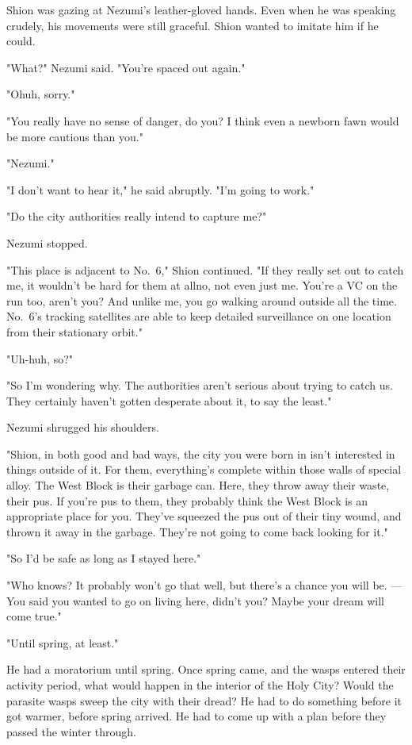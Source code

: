 Shion was gazing at Nezumi's leather-gloved hands. Even when he was
speaking crudely, his movements were still graceful. Shion wanted to
imitate him if he could.

"What?" Nezumi said. "You're spaced out again."

"Oh\el uh, sorry."

"You really have no sense of danger, do you? I think even a newborn fawn
would be more cautious than you."

"Nezumi."

"I don't want to hear it," he said abruptly. "I'm going to work."

"Do the city authorities really intend to capture me?"

Nezumi stopped.

"This place is adjacent to No.~6," Shion continued. "If they really set
out to catch me, it wouldn't be hard for them at all\el no, not even
just me. You're a VC on the run too, aren't you? And unlike me, you go
walking around outside all the time. No.~6's tracking satellites are
able to keep detailed surveillance on one location from their stationary
orbit."

"Uh-huh, so?"

"So I'm wondering why. The authorities aren't serious about trying to
catch us. They certainly haven't gotten desperate about it, to say the
least."

Nezumi shrugged his shoulders.

"Shion, in both good and bad ways, the city you were born in isn't
interested in things outside of it. For them, everything's complete
within those walls of special alloy. The West Block is their garbage
can. Here, they throw away their waste, their pus. If you're pus to
them, they probably think the West Block is an appropriate place for
you. They've squeezed the pus out of their tiny wound, and thrown it
away in the garbage. They're not going to come back looking for it."

"So I'd be safe as long as I stayed here."

"Who knows? It probably won't go that well, but there's a chance you
will be. ---You said you wanted to go on living here, didn't you? Maybe
your dream will come true."

"Until spring, at least."

He had a moratorium until spring. Once spring came, and the wasps
entered their activity period, what would happen in the interior of the
Holy City? Would the parasite wasps sweep the city with their dread? He
had to do something before it got warmer, before spring arrived. He had
to come up with a plan before they passed the winter through.

